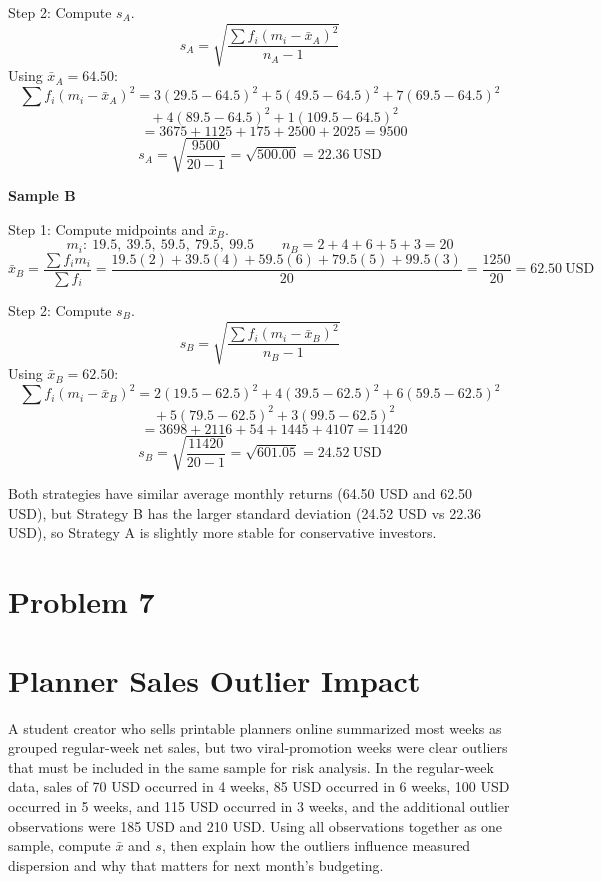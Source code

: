 \begin{ExamProblems}
		Step 2: Compute $s_A$.
		\[
		s_A = \sqrt{\frac{\sum f_i(m_i-\bar{x}_A)^2}{n_A-1}}
		\]
		Using $\bar{x}_A=64.50$:
		\[
		\sum f_i(m_i-\bar{x}_A)^2 = 3(29.5-64.5)^2 + 5(49.5-64.5)^2 + 7(69.5-64.5)^2
		\]
		\[
		\qquad + 4(89.5-64.5)^2 + 1(109.5-64.5)^2
		\]
		\[
		\qquad = 3675 + 1125 + 175 + 2500 + 2025 = 9500
		\]
		\[
		s_A = \sqrt{\frac{9500}{20-1}} = \sqrt{500.00} = 22.36\ \text{USD}
		\]

		\textbf{Sample B}

		Step 1: Compute midpoints and $\bar{x}_B$.
		\[
		m_i:\ 19.5,\ 39.5,\ 59.5,\ 79.5,\ 99.5
		\qquad
		n_B = 2+4+6+5+3 = 20
		\]
		\[
		\bar{x}_B = \frac{\sum f_i m_i}{\sum f_i}
		= \frac{19.5(2)+39.5(4)+59.5(6)+79.5(5)+99.5(3)}{20}
		= \frac{1250}{20}
		= 62.50\ \text{USD}
		\]

		Step 2: Compute $s_B$.
		\[
		s_B = \sqrt{\frac{\sum f_i(m_i-\bar{x}_B)^2}{n_B-1}}
		\]
		Using $\bar{x}_B=62.50$:
		\[
		\sum f_i(m_i-\bar{x}_B)^2 = 2(19.5-62.5)^2 + 4(39.5-62.5)^2 + 6(59.5-62.5)^2
		\]
		\[
		\qquad + 5(79.5-62.5)^2 + 3(99.5-62.5)^2
		\]
		\[
		\qquad = 3698 + 2116 + 54 + 1445 + 4107 = 11420
		\]
		\[
		s_B = \sqrt{\frac{11420}{20-1}} = \sqrt{601.05} = 24.52\ \text{USD}
		\]

		Both strategies have similar average monthly returns (64.50 USD and 62.50 USD), but Strategy B has the larger standard deviation (24.52 USD vs 22.36 USD), so Strategy A is slightly more stable for conservative investors.

		\newpage
		\item
		\section{Problem 7}
		\section{Planner Sales Outlier Impact}
		A student creator who sells printable planners online summarized most weeks as grouped regular-week net sales, but two viral-promotion weeks were clear outliers that must be included in the same sample for risk analysis. In the regular-week data, sales of 70 USD occurred in 4 weeks, 85 USD occurred in 6 weeks, 100 USD occurred in 5 weeks, and 115 USD occurred in 3 weeks, and the additional outlier observations were 185 USD and 210 USD. Using all observations together as one sample, compute $\bar{x}$ and $s$, then explain how the outliers influence measured dispersion and why that matters for next month's budgeting.


\end{ExamProblems}

